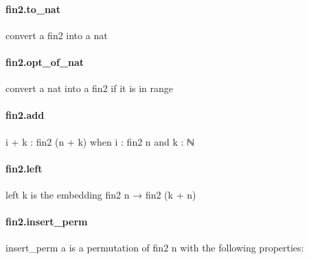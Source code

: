 \documentclass{article}
\begin{document}
\paragraph{fin2.to\_nat}
\par
convert a 
\colorbox[RGB]{253,246,227}{{{{\color[RGB]{101, 123, 131} fin2 }}}} into a 
\colorbox[RGB]{253,246,227}{{{{\color[RGB]{101, 123, 131} nat }}}}\paragraph{fin2.opt\_of\_nat}
\par
convert a 
\colorbox[RGB]{253,246,227}{{{{\color[RGB]{101, 123, 131} nat }}}} into a 
\colorbox[RGB]{253,246,227}{{{{\color[RGB]{101, 123, 131} fin2 }}}} if it is in range
\paragraph{fin2.add}
\par
\colorbox[RGB]{253,246,227}{{{{\color[RGB]{101, 123, 131} i  }}}{{{\color[RGB]{181, 137, 0} + }}}{{{\color[RGB]{101, 123, 131}  k : fin2 (n  }}}{{{\color[RGB]{181, 137, 0} + }}}{{{\color[RGB]{101, 123, 131}  k) }}}} when 
\colorbox[RGB]{253,246,227}{{{{\color[RGB]{101, 123, 131} i : fin2 n }}}} and 
\colorbox[RGB]{253,246,227}{{{{\color[RGB]{101, 123, 131} k : ℕ }}}}\paragraph{fin2.left}
\par
\colorbox[RGB]{253,246,227}{{{{\color[RGB]{101, 123, 131} left k }}}} is the embedding 
\colorbox[RGB]{253,246,227}{{{{\color[RGB]{101, 123, 131} fin2 n  }}}{{{\color[RGB]{133, 153, 0} → }}}{{{\color[RGB]{101, 123, 131}  fin2 (k  }}}{{{\color[RGB]{181, 137, 0} + }}}{{{\color[RGB]{101, 123, 131}  n) }}}}\paragraph{fin2.insert\_perm}
\par
\colorbox[RGB]{253,246,227}{{{{\color[RGB]{101, 123, 131} insert\_perm a }}}} is a permutation of 
\colorbox[RGB]{253,246,227}{{{{\color[RGB]{101, 123, 131} fin2 n }}}} with the following properties:
\end{document}

